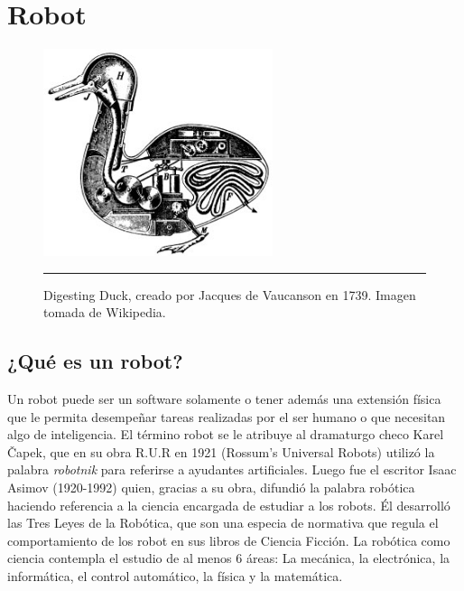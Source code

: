


\chapter{Robot} %

\label{Chapter2} %




\begin{figure}[htbp]
	\centering
		\includegraphics[width=0.6\textwidth]{./Figures/Duck_of_Vaucanson.jpg}
		\rule{35em}{0.5pt}
	\caption[Robot Digesting Duck]{Digesting Duck, creado por Jacques de Vaucanson en 1739. Imagen tomada de Wikipedia.}
	\label{fig:Duck}
\end{figure}



\section{¿Qué es un robot?}

Un robot puede ser un software solamente o tener además una extensión física que le permita desempeñar tareas realizadas por el ser humano o que necesitan algo de inteligencia. El término robot se le atribuye al dramaturgo checo Karel Čapek, que en su obra R.U.R en 1921 (Rossum’s Universal Robots) utilizó la palabra \textit{robotnik} para referirse a ayudantes artificiales. Luego fue el escritor Isaac Asimov (1920-1992) quien,  gracias a su obra, difundió la palabra robótica haciendo referencia a la ciencia encargada de estudiar a los robots. Él desarrolló las Tres Leyes de la Robótica, que son una especia de normativa que regula el comportamiento de los robot en sus libros de Ciencia Ficción. La robótica como ciencia contempla el estudio de al menos 6 áreas: La mecánica, la electrónica, la informática, el control automático, la física y la matemática.


